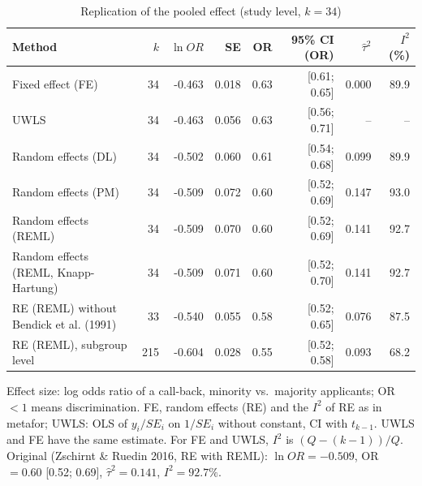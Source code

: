 \begin{table}[htbp]
\centering
\small
\caption{Replication of the pooled effect (study level, $k = 34$)}
\label{tab:replication}
\begin{tabular}{lrrrrrrr}
\toprule
Method & $k$ & $\ln OR$ & SE & OR & 95\% CI (OR) & $\hat\tau^2$ & $I^2$ (\%) \\
\midrule
Fixed effect (FE) & 34 & -0.463 & 0.018 & 0.63 & [0.61; 0.65] & 0.000 & 89.9 \\
UWLS & 34 & -0.463 & 0.056 & 0.63 & [0.56; 0.71] & -- & -- \\
Random effects (DL) & 34 & -0.502 & 0.060 & 0.61 & [0.54; 0.68] & 0.099 & 89.9 \\
Random effects (PM) & 34 & -0.509 & 0.072 & 0.60 & [0.52; 0.69] & 0.147 & 93.0 \\
Random effects (REML) & 34 & -0.509 & 0.070 & 0.60 & [0.52; 0.69] & 0.141 & 92.7 \\
Random effects (REML, Knapp-Hartung) & 34 & -0.509 & 0.071 & 0.60 & [0.52; 0.70] & 0.141 & 92.7 \\
\midrule
RE (REML) without Bendick et al. (1991) & 33 & -0.540 & 0.055 & 0.58 & [0.52; 0.65] & 0.076 & 87.5 \\
RE (REML), subgroup level & 215 & -0.604 & 0.028 & 0.55 & [0.52; 0.58] & 0.093 & 68.2 \\
\bottomrule
\end{tabular}
\par\smallskip\parbox{0.95\linewidth}{\footnotesize Effect size: log odds ratio of a call-back, minority vs.\ majority applicants; OR $<1$ means discrimination. FE, random effects (RE) and the $I^2$ of RE as in metafor; UWLS: OLS of $y_i/SE_i$ on $1/SE_i$ without constant, CI with $t_{k-1}$. UWLS and FE have the same estimate. For FE and UWLS, $I^2$ is $(Q-(k-1))/Q$. Original (Zschirnt \& Ruedin 2016, RE with REML): $\ln OR = -0.509$, OR $= 0.60$ [0.52; 0.69], $\hat\tau^2 = 0.141$, $I^2 = 92.7\%$.}
\end{table}
